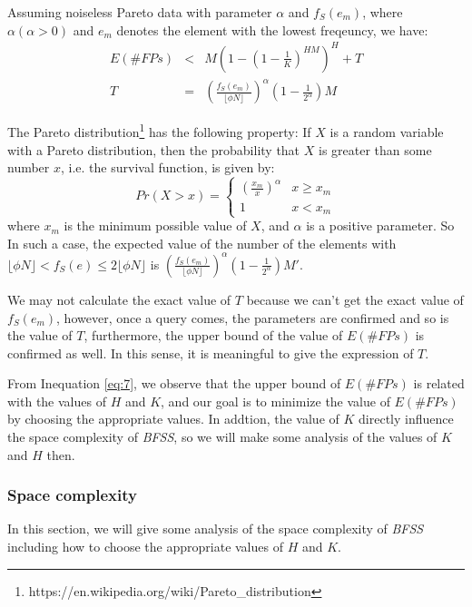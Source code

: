 \documentclass[conference]{IEEEtran}
\begin{document}
\begin{theorem}\label{thm:3}
Assuming noiseless Pareto data with parameter $\alpha$ and $f_S(e_m)$, where $\alpha (\alpha >0)$ and $e_m$ denotes the element with the lowest freqeuncy, we have:
\setlength{\arraycolsep}{0.0em}
\begin{eqnarray}
	E(\#FPs)&<&M(1-(1-\frac{1}{K})^{HM})^H + T\\
	T&=&(\frac{f_S(e_m)}{\lfloor \phi N\rfloor})^\alpha(1-\frac{1}{2^\alpha})M\label{eq:10}
\end{eqnarray}
\setlength{\arraycolsep}{5pt}
\end{theorem}

\begin{IEEEproof}
The Pareto distribution\footnote{https://en.wikipedia.org/wiki/Pareto\_distribution} has the following property: If $X$ is a random variable with a Pareto distribution, then the probability that $X$ is greater than some number $x$, i.e. the survival function, is given by:
$$Pr(X>x)=
\begin{cases}
(\frac{x_m}{x})^\alpha & x\geq x_m\\
1 & x<x_m
\end{cases}$$
where $x_m$ is the minimum possible value of $X$, and $\alpha$ is a positive parameter. So In such a case, the expected value of the number of the elements with $\lfloor \phi N\rfloor<f_S(e)\leq 2\lfloor\phi N\rfloor$ is $(\frac{f_S(e_m)}{\lfloor \phi N\rfloor})^\alpha(1-\frac{1}{2^\alpha})M'$.
\end{IEEEproof}
We may not calculate the exact value of $T$ because we can't get the exact value of $f_S(e_m)$, however, once a query comes, the parameters are confirmed and so is the value of $T$, furthermore, the upper bound of the value of $E(\#FPs)$ is confirmed as well. In this sense, it is meaningful to give the expression of $T$.\par
From Inequation \ref{eq:7}, we observe that the upper bound of $E(\#FPs)$ is related with the values of $H$ and $K$, and our goal is to minimize the value of  $E(\#FPs)$ by choosing the appropriate values. In addtion, the value of $K$ directly influence the space complexity of \emph{BFSS}, so we will make some analysis of the values of $K$ and $H$ then.


\subsubsection{\textbf{Space complexity}}\label{sec:space}
In this section, we will give some analysis of the space complexity of \emph{BFSS} including how to choose the appropriate values of $H$ and $K$.
\end{document}
